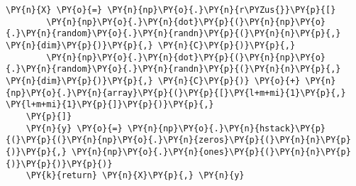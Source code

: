 \begin{Verbatim}[commandchars=\\\{\}]
    \PY{n}{X} \PY{o}{=} \PY{n}{np}\PY{o}{.}\PY{n}{r\PYZus{}}\PY{p}{[}
        \PY{n}{np}\PY{o}{.}\PY{n}{dot}\PY{p}{(}\PY{n}{np}\PY{o}{.}\PY{n}{random}\PY{o}{.}\PY{n}{randn}\PY{p}{(}\PY{n}{n}\PY{p}{,} \PY{n}{dim}\PY{p}{)}\PY{p}{,} \PY{n}{C}\PY{p}{)}\PY{p}{,}
        \PY{n}{np}\PY{o}{.}\PY{n}{dot}\PY{p}{(}\PY{n}{np}\PY{o}{.}\PY{n}{random}\PY{o}{.}\PY{n}{randn}\PY{p}{(}\PY{n}{n}\PY{p}{,} \PY{n}{dim}\PY{p}{)}\PY{p}{,} \PY{n}{C}\PY{p}{)} \PY{o}{+} \PY{n}{np}\PY{o}{.}\PY{n}{array}\PY{p}{(}\PY{p}{[}\PY{l+m+mi}{1}\PY{p}{,} \PY{l+m+mi}{1}\PY{p}{]}\PY{p}{)}\PY{p}{,}
    \PY{p}{]}
    \PY{n}{y} \PY{o}{=} \PY{n}{np}\PY{o}{.}\PY{n}{hstack}\PY{p}{(}\PY{p}{(}\PY{n}{np}\PY{o}{.}\PY{n}{zeros}\PY{p}{(}\PY{n}{n}\PY{p}{)}\PY{p}{,} \PY{n}{np}\PY{o}{.}\PY{n}{ones}\PY{p}{(}\PY{n}{n}\PY{p}{)}\PY{p}{)}\PY{p}{)}
    \PY{k}{return} \PY{n}{X}\PY{p}{,} \PY{n}{y}


\end{Verbatim}

